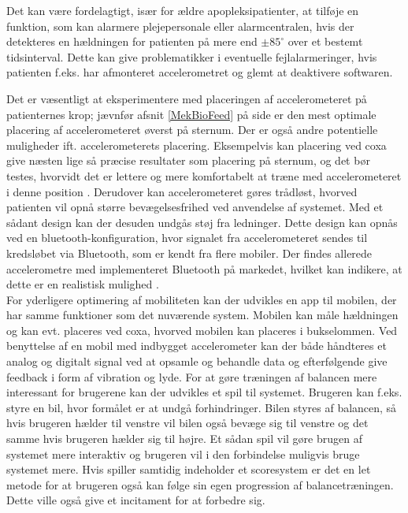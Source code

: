 Det kan være fordelagtigt, især for ældre apopleksipatienter, at tilføje en funktion, som kan alarmere plejepersonale eller alarmcentralen, hvis der detekteres en hældningen for patienten på mere end $\pm85^{\circ}$ over et bestemt tidsinterval. Dette kan give problematikker i eventuelle fejlalarmeringer, hvis patienten f.eks. har afmonteret accelerometret og glemt at deaktivere softwaren.

Det er væsentligt at eksperimentere med placeringen af accelerometeret på patienternes krop; jævnfør afsnit \ref{MekBioFeed} på side \pageref{MekBioFeed} er den mest optimale placering af accelerometeret øverst på sternum. Der er også andre potentielle muligheder ift. accelerometerets placering. Eksempelvis kan placering ved coxa give næsten lige så præcise resultater som placering på sternum, og det bør testes, hvorvidt det er lettere og mere komfortabelt at træne med accelerometeret i denne position \cite{Gjoreski2011}. Derudover kan accelerometeret gøres trådløst, hvorved patienten vil opnå større bevægelsesfrihed ved anvendelse af systemet. Med et sådant design kan der desuden undgås støj fra ledninger. Dette design kan opnås ved en bluetooth-konfiguration, hvor signalet fra accelerometeret sendes til kredsløbet via Bluetooth, som er kendt fra flere mobiler. Der findes allerede accelerometre med implementeret Bluetooth på markedet, hvilket kan indikere, at dette er en realistisk mulighed \cite{Axivity2015, Bioradio2015}. \\
For yderligere optimering af mobiliteten kan der udvikles en app til mobilen, der har samme funktioner som det nuværende system. Mobilen kan måle hældningen og kan evt. placeres ved coxa, hvorved mobilen kan placeres i bukselommen. Ved benyttelse af en mobil med indbygget accelerometer kan der både håndteres et analog og digitalt signal ved at opsamle og behandle data og efterfølgende give feedback i form af vibration og lyde. %
For at gøre træningen af balancen mere interessant for brugerene kan der udvikles et spil til systemet. Brugeren kan f.eks. styre en bil, hvor formålet er at undgå forhindringer. Bilen styres af balancen, så hvis brugeren hælder til venstre vil bilen også bevæge sig til venstre og det samme hvis brugeren hælder sig til højre. Et sådan spil vil gøre brugen af systemet mere interaktiv og brugeren vil i den forbindelse muligvis bruge systemet mere. Hvis spiller samtidig indeholder et scoresystem er det en let metode for at brugeren også kan følge sin egen progression af balancetræningen. Dette ville også give et incitament for at forbedre sig. 
